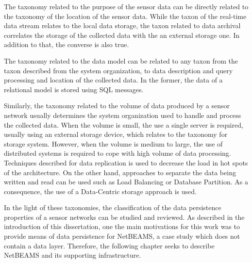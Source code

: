 The taxonomy related to the purpose of the sensor data can be directly related
to the taxonomy of the location of the sensor data. While the taxon of the 
real-time data stream relates to the local data storage, the taxon related to
data archival correlates the storage of the collected data with the an external
storage one. In addition to that, the converse is also true.

The taxonomy related to the data model can be related to any taxon from the
taxon described from the system organization, to data description and query
processing and location of the collected data. In the former, the data of a
relational model is stored using SQL messages.

Similarly, the taxonomy related to the volume of data produced by a sensor
network usually determines the system organization used to handle and process
the collected data. When the volume is small, the use a single server is
required, usually using an external storage device, which relates to the
taxonomy for storage system. However, when the volume is medium to large, the
use of distributed systems is required to cope with high volume of data
processing. Techniques described for data replication is used to decrease the
load in hot spots of the architecture. On the other hand, approaches to
separate the data being written and read can be used such as Load Balancing or
Database Partition. As a consequence, the use of a Data-Centric storage
approach is used.

In the light of these taxonomies, the classification of the data persistence
properties of a sensor networks can be studied and reviewed. As described in
the introduction of this dissertation, one the main motivations for this work
was to provide means of data persistence for NetBEAMS, a case study which does
not contain a data layer. Therefore, the following chapter seeks to describe
NetBEAMS and its supporting infrastructure.
